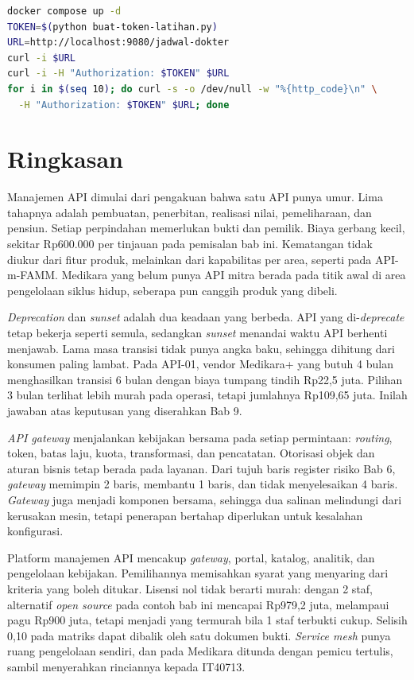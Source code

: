\begin{pendalaman}[title={Pendalaman Teknis (opsional): Menjalankan Gateway Open Source di Docker}]
\begin{lstlisting}[language=bash, captionpos=b, xleftmargin=8pt, caption={Menjalankan dan menguji \textit{gateway} lokal, tersedia di \berkas{sources/chapter10/README.md}}, label={lst:ch10-perintah}]
docker compose up -d
TOKEN=$(python buat-token-latihan.py)
URL=http://localhost:9080/jadwal-dokter
curl -i $URL
curl -i -H "Authorization: $TOKEN" $URL
for i in $(seq 10); do curl -s -o /dev/null -w "%{http_code}\n" \
  -H "Authorization: $TOKEN" $URL; done
\end{lstlisting}
\end{pendalaman}

\section{Ringkasan}

Manajemen API dimulai dari pengakuan bahwa satu API punya umur. Lima tahapnya adalah pembuatan, penerbitan, realisasi
nilai, pemeliharaan, dan pensiun. Setiap perpindahan memerlukan bukti dan pemilik. Biaya gerbang kecil, sekitar
Rp600.000 per tinjauan pada pemisalan bab ini. Kematangan tidak diukur dari fitur produk, melainkan dari kapabilitas per
area, seperti pada API-m-FAMM. Medikara yang belum punya API mitra berada pada titik awal di area pengelolaan siklus
hidup, seberapa pun canggih produk yang dibeli.

\textit{Deprecation} dan \textit{sunset} adalah dua keadaan yang berbeda. API yang di-\textit{deprecate} tetap bekerja
seperti semula, sedangkan \textit{sunset} menandai waktu API berhenti menjawab. Lama masa transisi tidak punya angka
baku, sehingga dihitung dari konsumen paling lambat. Pada API-01, vendor Medikara+ yang butuh 4 bulan menghasilkan
transisi 6 bulan dengan biaya tumpang tindih Rp22,5 juta. Pilihan 3 bulan terlihat lebih murah pada operasi, tetapi
jumlahnya Rp109,65 juta. Inilah jawaban atas keputusan yang diserahkan Bab 9.

\textit{API gateway} menjalankan kebijakan bersama pada setiap permintaan: \textit{routing}, token, batas laju, kuota,
transformasi, dan pencatatan. Otorisasi objek dan aturan bisnis tetap berada pada layanan. Dari tujuh baris register
risiko Bab 6, \textit{gateway} memimpin 2 baris, membantu 1 baris, dan tidak menyelesaikan 4 baris. \textit{Gateway}
juga menjadi komponen bersama, sehingga dua salinan melindungi dari kerusakan mesin, tetapi penerapan bertahap
diperlukan untuk kesalahan konfigurasi.

Platform manajemen API mencakup \textit{gateway}, portal, katalog, analitik, dan pengelolaan kebijakan. Pemilihannya
memisahkan syarat yang menyaring dari kriteria yang boleh ditukar. Lisensi nol tidak berarti murah: dengan 2 staf,
alternatif \textit{open source} pada contoh bab ini mencapai Rp979,2 juta, melampaui pagu Rp900 juta, tetapi menjadi
yang termurah bila 1 staf terbukti cukup. Selisih 0,10 pada matriks dapat dibalik oleh satu dokumen bukti.
\textit{Service mesh} punya ruang pengelolaan sendiri, dan pada Medikara ditunda dengan pemicu tertulis, sambil
menyerahkan rinciannya kepada IT40713.

